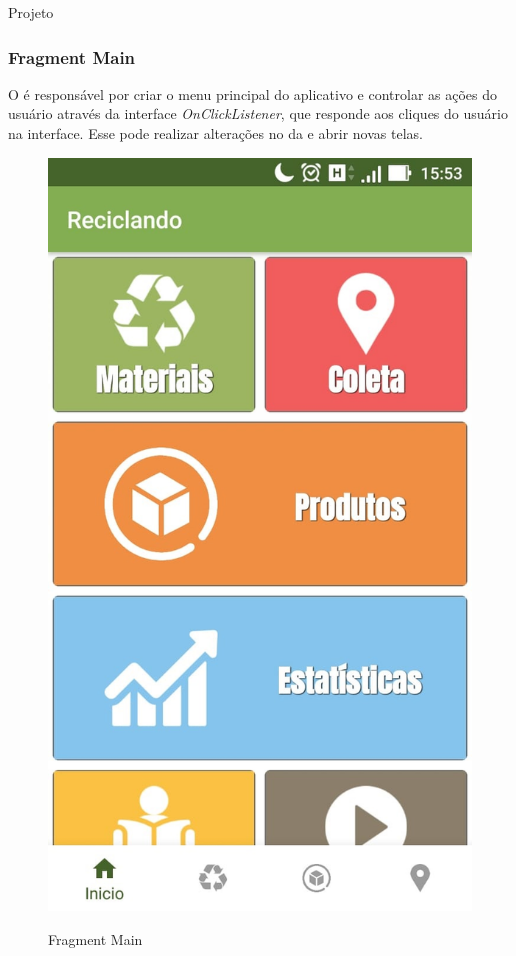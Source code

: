 \documentclass[
	12pt,				%
	openright,			%
	twoside,			%
	a4paper,			%
	english,			%
	french,				%
	spanish,			%
	brazil				%
	]{abntex2}
\begin{document}
\begin{chapter}{Projeto}
\newpage
\subsubsection{Fragment Main} \label{main_fragment}
O  é responsável por criar o menu principal do aplicativo e controlar as ações do usuário através da interface \textit{OnClickListener}, que responde aos cliques do usuário na interface. Esse  pode realizar alterações no  da  e abrir novas telas.

\begin{figure}[h]
\centering
   \caption{Fragment Main}
   \includegraphics[scale=0.4]{media/fragment_main.jpg}
     \label{fig:fragment_main_app}
\end{figure}


\end{chapter}
\end{document}
